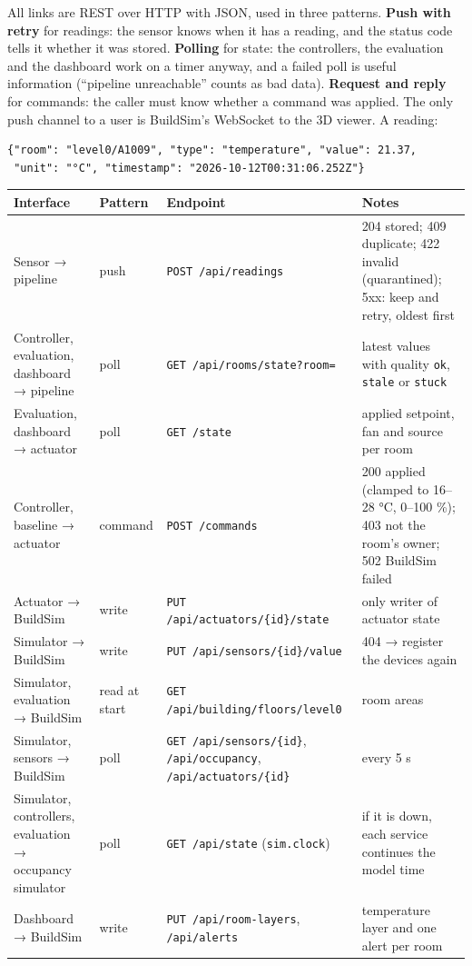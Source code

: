 \documentclass[11pt]{article}
\begin{document}
All links are REST over HTTP with JSON, used in three patterns. \textbf{Push with retry} for
readings: the sensor knows when it has a reading, and the status code tells it whether it was
stored. \textbf{Polling} for state: the controllers, the evaluation and the dashboard work on a
timer anyway, and a failed poll is useful information (``pipeline unreachable'' counts as bad
data). \textbf{Request and reply} for commands: the caller must know whether a command was
applied. The only push channel to a user is BuildSim's WebSocket to the 3D viewer. A reading:

\begin{verbatim}
{"room": "level0/A1009", "type": "temperature", "value": 21.37,
 "unit": "°C", "timestamp": "2026-10-12T00:31:06.252Z"}
\end{verbatim}

\begin{longtable}{@{}L{0.21}L{0.12}L{0.33}L{0.34}@{}}
\toprule
\textbf{Interface} & \textbf{Pattern} & \textbf{Endpoint} & \textbf{Notes} \\
\midrule
\endhead
\bottomrule
\endlastfoot
Sensor → pipeline & push & \texttt{POST /api/readings} & 204 stored; 409 duplicate; 422 invalid (quarantined); 5xx: keep and retry, oldest first \\
Controller, evaluation, dashboard → pipeline & poll & \texttt{GET /api/rooms/state?room=} & latest values with quality \texttt{ok}, \texttt{stale} or \texttt{stuck} \\
Evaluation, dashboard → actuator & poll & \texttt{GET /state} & applied setpoint, fan and source per room \\
Controller, baseline → actuator & command & \texttt{POST /commands} & 200 applied (clamped to 16--28 °C, 0--100 \%); 403 not the room's owner; 502 BuildSim failed \\
Actuator → BuildSim & write & \texttt{PUT /api/actuators/\{id\}/state} & only writer of actuator state \\
Simulator → BuildSim & write & \texttt{PUT /api/sensors/\{id\}/value} & 404 → register the devices again \\
Simulator, evaluation → BuildSim & read at start & \texttt{GET /api/building/floors/level0} & room areas \\
Simulator, sensors → BuildSim & poll & \texttt{GET /api/sensors/\{id\}}, \texttt{/api/occupancy}, \texttt{/api/actuators/\{id\}} & every 5 s \\
Simulator, controllers, evaluation → occupancy simulator & poll & \texttt{GET /api/state} (\texttt{sim.clock}) & if it is down, each service continues the model time \\
Dashboard → BuildSim & write & \texttt{PUT /api/room-layers}, \texttt{/api/alerts} & temperature layer and one alert per room \\
\end{longtable}
\end{document}
